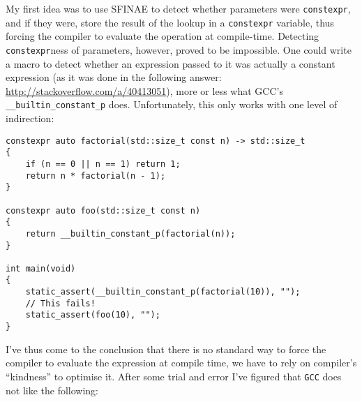 \documentclass[a4paper,12pt]{article}
\begin{document}
    My first idea was to use SFINAE to detect whether parameters were \texttt{constexpr}, and if they were, store the result of the lookup in a \texttt{constexpr} variable, thus forcing the compiler to evaluate the operation at compile-time. Detecting \texttt{constexpr}ness of parameters, however, proved to be impossible. One could write a macro to detect whether an expression passed to it was actually a constant expression (as it was done in the following answer: \url{http://stackoverflow.com/a/40413051}), more or less what GCC's \texttt{\_\_builtin\_constant\_p} does. Unfortunately, this only works with one level of indirection:
    \begin{spacing}{0.8}
\begin{lstlisting}
constexpr auto factorial(std::size_t const n) -> std::size_t
{
	if (n == 0 || n == 1) return 1;
	return n * factorial(n - 1);
}

constexpr auto foo(std::size_t const n)
{
	return __builtin_constant_p(factorial(n));
}

int main(void)
{
	static_assert(__builtin_constant_p(factorial(10)), "");
	// This fails!
	static_assert(foo(10), "");
}
\end{lstlisting}
    \end{spacing}
    I've thus come to the conclusion that there is no standard way to force the compiler to evaluate the expression at compile time, we have to rely on compiler's ``kindness'' to optimise it. After some trial and error I've figured that \texttt{GCC} does not like the following:
\end{document}
